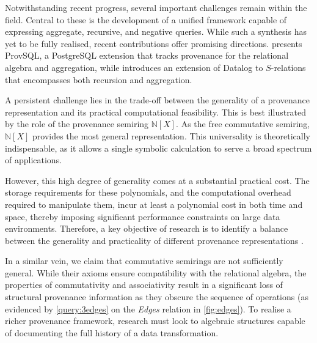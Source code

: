 \documentclass[oneside, 11pt]{amsbook}
\theoremstyle{plain}
\theoremstyle{definition}
\theoremstyle{remark}
\begin{document}
Notwithstanding recent progress, several important challenges remain within the field. Central to these is the development of a unified framework capable of expressing aggregate, recursive, and negative queries. While such a synthesis has yet to be fully realised, recent contributions offer promising directions. \cite{Sen2025} presents ProvSQL, a PostgreSQL extension that tracks provenance for the relational algebra and aggregation, while \cite{AboKhamis2024} introduces an extension of Datalog to $S$-relations that encompasses both recursion and aggregation.

A persistent challenge lies in the trade-off between the generality of a provenance representation and its practical computational feasibility. This is best illustrated by the role of the provenance semiring $\mathbb{N}[X]$. As the free commutative semiring, $\mathbb{N}[X]$ provides the most general representation. This universality is theoretically indispensable, as it allows a single symbolic calculation to serve a broad spectrum of applications.

However, this high degree of generality comes at a substantial practical cost. The storage requirements for these polynomials, and the computational overhead required to manipulate them, incur at least a polynomial cost in both time and space, thereby imposing significant performance constraints on large data environments. Therefore, a key objective of research is to identify a balance between the generality and practicality of different provenance representations \cite{Glavic2021}.

In a similar vein, we claim that commutative semirings are not sufficiently general. While their axioms ensure compatibility with the relational algebra, the properties of commutativity and associativity result in a significant loss of structural provenance information as they obscure the sequence of operations (as evidenced by \autoref{query:3edges} on the \textit{Edges} relation in \autoref{fig:edges}). To realise a richer provenance framework, research must look to algebraic structures capable of documenting the full history of a data transformation.

\printbibliography
\end{document}
